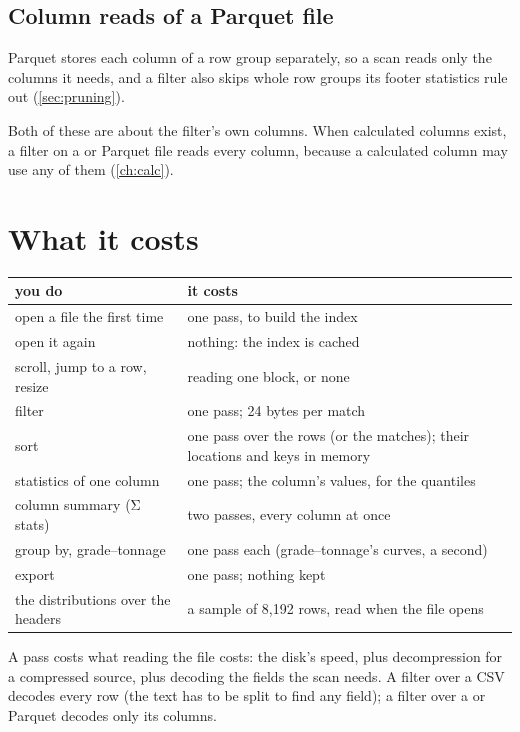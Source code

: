 \subsection{Column reads of a Parquet file}

Parquet stores each column of a row group separately, so a scan reads only the columns it needs, and a
filter also skips whole row groups its footer statistics rule out (\cref{sec:pruning}).

\begin{note}
Both of these are about the filter's own columns. When calculated columns exist, a filter on a
 or Parquet file reads every column, because a calculated column may use any of them
(\cref{ch:calc}).
\end{note}

\section{What it costs}\label{sec:costs}

\begin{center}\small
\begin{tabularx}{\linewidth}{@{}lL@{}}
\toprule
\sffamily\bfseries you do & \sffamily\bfseries it costs \\
\midrule
open a file the first time & one pass, to build the index \\
open it again & nothing: the index is cached \\
scroll, jump to a row, resize & reading one block, or none \\
filter & one pass; 24 bytes per match \\
sort & one pass over the rows (or the matches); their locations and keys in memory \\
statistics of one column & one pass; the column's values, for the quantiles \\
column summary (Σ stats) & two passes, every column at once \\
group by, grade–tonnage & one pass each (grade–tonnage's curves, a second) \\
export & one pass; nothing kept \\
the distributions over the headers & a sample of 8{,}192 rows, read when the file opens \\
\bottomrule
\end{tabularx}
\end{center}

A pass costs what reading the file costs: the disk's speed, plus decompression for a compressed source,
plus decoding the fields the scan needs. A filter over a CSV decodes every row (the text has to be split
to find any field); a filter over a  or Parquet decodes only its columns.

